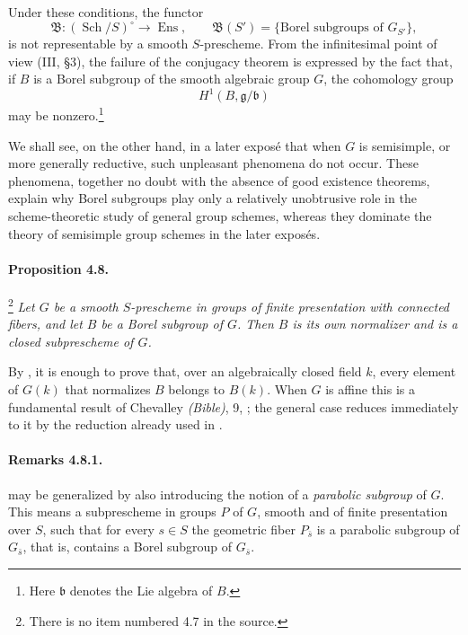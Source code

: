 Under these conditions, the functor
\[
  \mathfrak B\colon(\operatorname{Sch}/S)^\circ
    \longrightarrow \operatorname{Ens},
  \qquad
  \mathfrak B(S')=
  \{\text{Borel subgroups of }G_{S'}\},
\]
is not representable by a smooth \(S\)-prescheme. From the
infinitesimal point of view \textup{(III, \S3)}, the failure of the
conjugacy theorem is expressed by the fact that, if \(B\) is a
Borel subgroup of the smooth algebraic group \(G\), the cohomology
group
\[
  H^1(B,\mathfrak g/\mathfrak b)
\]
may be nonzero.\footnote{Here \(\mathfrak b\) denotes the Lie
algebra of \(B\).}

We shall see, on the other hand, in a later exposé that when \(G\)
is semisimple, or more generally reductive, such unpleasant
phenomena do not occur. These phenomena, together no doubt with
the absence of good existence theorems, explain why Borel
subgroups play only a relatively unobtrusive role in the
scheme-theoretic study of general group schemes, whereas they
dominate the theory of semisimple group schemes in the later
exposés.

\paragraph{\textbf{Proposition 4.8.}}
\footnote{There is no item numbered 4.7 in the source.}
{\itshape Let \(G\) be a smooth \(S\)-prescheme in groups of finite
presentation with connected fibers, and let \(B\) be a Borel
subgroup of \(G\). Then \(B\) is its own normalizer and is a closed
subprescheme of \(G\).}

By , it is enough to prove that, over an algebraically
closed field \(k\), every element of \(G(k)\) that normalizes \(B\)
belongs to \(B(k)\). When \(G\) is affine this is a fundamental
result of Chevalley
\textup{\emph{(Bible)}, 9, }; the general case reduces
immediately to it by the reduction already used in .

\paragraph{\textbf{Remarks 4.8.1.}}
 may be generalized by also introducing the notion
of a \emph{parabolic subgroup} of \(G\). This means a subprescheme
in groups \(P\) of \(G\), smooth and of finite presentation over
\(S\), such that for every \(s\in S\) the geometric fiber
\(P_{\bar s}\) is a parabolic subgroup of \(G_{\bar s}\), that is,
contains a Borel subgroup of \(G_{\bar s}\).

